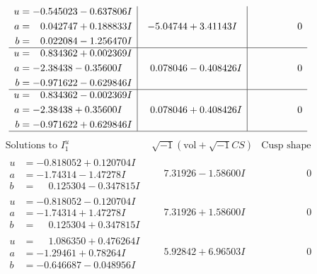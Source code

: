 \documentclass[1p]{elsarticle_modified}
\theoremstyle{definition}
\newcommand{\I}{\sqrt{-1}}
\begin{document}
$$\begin{array}{c|c|c}
\begin{aligned}
u &= -0.545023 - 0.637806 I \\
a &= \phantom{-}0.042747 + 0.188833 I \\
b &= \phantom{-}0.022084 - 1.256470 I\end{aligned}
 & -5.04744 + 3.41143 I & \phantom{-0.000000 } 0 \\ \hline\begin{aligned}
u &= \phantom{-}0.834362 + 0.002369 I \\
a &= -2.38438 - 0.35600 I \\
b &= -0.971622 - 0.629846 I\end{aligned}
 & \phantom{-}0.078046 - 0.408426 I & \phantom{-0.000000 } 0 \\ \hline\begin{aligned}
u &= \phantom{-}0.834362 - 0.002369 I \\
a &= -2.38438 + 0.35600 I \\
b &= -0.971622 + 0.629846 I\end{aligned}
 & \phantom{-}0.078046 + 0.408426 I & \phantom{-0.000000 } 0\\
 \hline 
 \end{array}$$\newpage$$\begin{array}{c|c|c}  
\text{Solutions to }I^u_{1}& \I (\text{vol} + \sqrt{-1}CS) & \text{Cusp shape}\\
 \hline 
\begin{aligned}
u &= -0.818052 + 0.120704 I \\
a &= -1.74314 - 1.47278 I \\
b &= \phantom{-}0.125304 - 0.347815 I\end{aligned}
 & \phantom{-}7.31926 - 1.58600 I & \phantom{-0.000000 } 0 \\ \hline\begin{aligned}
u &= -0.818052 - 0.120704 I \\
a &= -1.74314 + 1.47278 I \\
b &= \phantom{-}0.125304 + 0.347815 I\end{aligned}
 & \phantom{-}7.31926 + 1.58600 I & \phantom{-0.000000 } 0 \\ \hline\begin{aligned}
u &= \phantom{-}1.086350 + 0.476264 I \\
a &= -1.29461 + 0.78264 I \\
b &= -0.646687 - 0.048956 I\end{aligned}
 & \phantom{-}5.92842 + 6.96503 I & \phantom{-0.000000 } 0 \\ \hline\begin{aligned}

\end{aligned}
\end{array}$$
\end{document}
